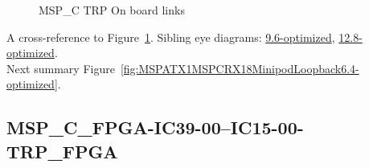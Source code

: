 \begin{figure}[h]
\begin{subfigure}{0.25\textwidth}
\hyperref[sec:MSPCFPGAIC3924IC1524TRPFPGA6.4-optimized]{}
\end{subfigure}\hspace*{\fill}
\begin{subfigure}{0.25\textwidth}
\hyperref[sec:MSPCFPGAIC3925IC1525TRPFPGA6.4-optimized]{}
\end{subfigure}\hspace*{\fill}
\begin{subfigure}{0.25\textwidth}
\hyperref[sec:MSPCFPGAIC3926IC1526TRPFPGA6.4-optimized]{}
\end{subfigure}\hspace*{\fill}
\begin{subfigure}{0.25\textwidth}
\hyperref[sec:MSPCFPGAIC3927IC1527TRPFPGA6.4-optimized]{}
\end{subfigure}

\caption{MSP\_C TRP On board links} \label{fig:MSPCTRPOnboardlinks6.4-optimized}
\end{figure}

A cross-reference to Figure~\ref{fig:MSPCTRPOnboardlinks6.4-optimized}.
Sibling eye diagrams: \hyperref[sec:MSPCTRPOnboardlinks9.6-optimized]{9.6-optimized}, \hyperref[sec:MSPCTRPOnboardlinks12.8-optimized]{12.8-optimized}. \\
Next summary Figure~\ref{fig:MSPATX1MSPCRX18MinipodLoopback6.4-optimized}.
\clearpage
% 
\subsection{MSP\_C\_FPGA-IC39-00--IC15-00-TRP\_FPGA}\label{sec:MSPCFPGAIC3900IC1500TRPFPGA6.4-optimized}

